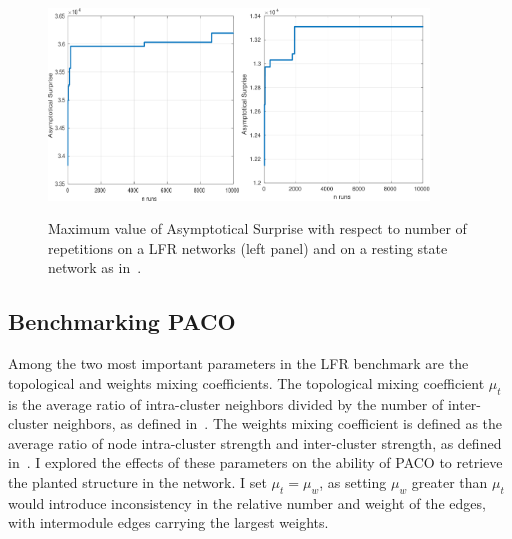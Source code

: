 \noindent\begin{figure}[!htb]
\centering
\includegraphics[width=0.45\textwidth]{images/paco_variability_nreps_lfr.png}\includegraphics[width=0.45\textwidth]{images/paco_variability_nreps_bullmore.png}
\caption{Maximum value of Asymptotical Surprise with respect to number of repetitions on a LFR networks (left panel) and on a resting state network as in~\cite{crossley2013a}.}
\label{fig:paco_variability}
\end{figure}


\subsection{Benchmarking PACO}
Among the two most important parameters in the LFR benchmark are the topological and weights mixing coefficients. 
The topological mixing coefficient $\mu_t$ is the average ratio of intra-cluster neighbors divided by the number of inter-cluster neighbors, as defined in~\cite{lancichinetti2008}.
The weights mixing coefficient is defined as the average ratio of node intra-cluster strength and inter-cluster strength, as defined in~\cite{lancichinetti2009a}.
I explored the effects of these parameters on the ability of PACO to retrieve the planted structure in the network.
I set $\mu_t=\mu_w$, as setting $\mu_w$ greater than $\mu_t$ would introduce inconsistency in the relative number and weight of the edges, with intermodule edges carrying the largest weights.

